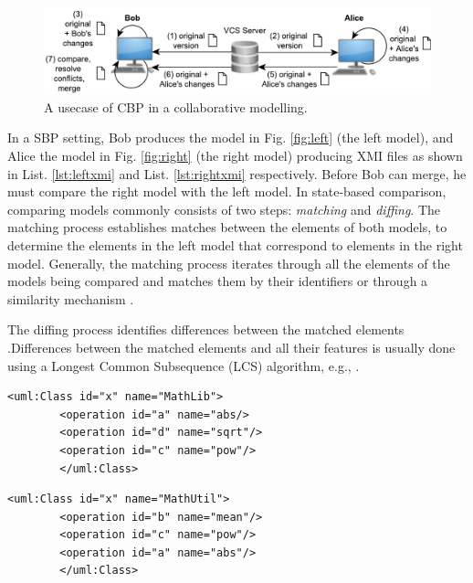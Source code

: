 \documentclass{jot}
\begin{document}
    \begin{figure}[ht]
        \includegraphics[width=\linewidth]{VCS}
        \caption{A usecase of CBP in a collaborative modelling.}
        \label{fig:vcs}
    \end{figure}
    
    
    In a SBP setting, Bob produces the model in Fig. \ref{fig:left} (the left model), and Alice the model in Fig. \ref{fig:right} (the right model) producing XMI files as shown in List. \ref{lst:leftxmi} and List. \ref{lst:rightxmi} respectively.
    Before Bob can merge, he must compare the right model with the left model.
    In state-based comparison, comparing models commonly consists of two steps: \emph{matching} and \emph{diffing}.
    The matching process establishes matches between the elements of both models, to determine the elements in the left model that correspond to elements in the right model.
    Generally, the matching process iterates through all the elements of the models being compared and matches them by their identifiers or through a similarity mechanism  \cite{DBLP:conf/sfm/BroschKLSWW12,emfcompare2018developer}.
    
    The diffing process identifies differences between the matched elements \cite{DBLP:conf/sfm/BroschKLSWW12,emfcompare2018developer}.Differences between the matched elements and all their features is usually done using a Longest Common Subsequence (LCS) algorithm, e.g., \cite{DBLP:journals/algorithmica/Meyers86}.
    
    \vspace{-10pt}
    \begin{minipage}[t]{0.49\linewidth} 
        \begin{lstlisting}[style=eol,caption={The simplified XMI of the left model in Fig. \ref{fig:left}.},label=lst:leftxmi]
        <uml:Class id="x" name="MathLib">
        <operation id="a" name="abs/>
        <operation id="d" name="sqrt"/>
        <operation id="c" name="pow"/>
        </uml:Class>
        \end{lstlisting}
    \end{minipage}
    \hfill
    \begin{minipage}[t]{0.49\linewidth}
        \begin{lstlisting}[style=eol,caption={The simplified XMI of the right model in Fig. \ref{fig:right}.},label=lst:rightxmi]
        <uml:Class id="x" name="MathUtil">
        <operation id="b" name="mean"/>
        <operation id="c" name="pow"/>
        <operation id="a" name="abs"/>
        </uml:Class>
        \end{lstlisting}
    \end{minipage}
    
\end{document}
